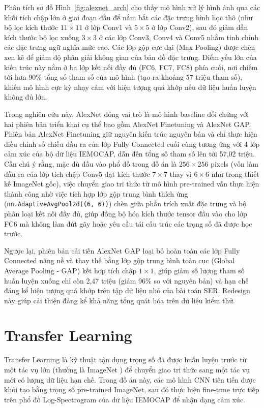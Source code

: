 Phân tích sơ đồ Hình~\ref{fig:alexnet_arch} cho thấy mô hình xử lý hình ảnh qua các khối tích chập lớn ở giai đoạn đầu để nắm bắt các đặc trưng hình học thô (như bộ lọc kích thước $11\times11$ ở lớp Conv1 và $5\times5$ ở lớp Conv2), sau đó giảm dần kích thước bộ lọc xuống $3\times3$ ở các lớp Conv3, Conv4 và Conv5 nhằm tinh chỉnh các đặc trưng ngữ nghĩa mức cao. Các lớp gộp cực đại (Max Pooling) được chèn xen kẽ để giảm độ phân giải không gian của bản đồ đặc trưng. Điểm yếu lớn của kiến trúc này nằm ở ba lớp kết nối đầy đủ (FC6, FC7, FC8) phía cuối, nơi chiếm tới hơn 90\% tổng số tham số của mô hình (tạo ra khoảng 57 triệu tham số), khiến mô hình cực kỳ nhạy cảm với hiện tượng quá khớp nếu dữ liệu huấn luyện không đủ lớn.

Trong nghiên cứu này, AlexNet đóng vai trò là mô hình baseline đối chứng với hai phiên bản triển khai cụ thể bao gồm AlexNet Finetuning và AlexNet GAP. Phiên bản AlexNet Finetuning giữ nguyên kiến trúc nguyên bản và chỉ thực hiện điều chỉnh số chiều đầu ra của lớp Fully Connected cuối cùng tương ứng với 4 lớp cảm xúc của bộ dữ liệu IEMOCAP, dẫn đến tổng số tham số lên tới 57,02 triệu. Cần chú ý rằng, mặc dù đầu vào phổ đồ trong đồ án là $256 \times 256$ pixels (vốn làm đầu ra của lớp tích chập Conv5 đạt kích thước $7 \times 7$ thay vì $6 \times 6$ như trong thiết kế ImageNet gốc), việc chuyển giao tri thức từ mô hình pre-trained vẫn thực hiện thành công nhờ việc tích hợp lớp gộp trung bình thích ứng (\texttt{nn.AdaptiveAvgPool2d((6, 6))}) chèn giữa phần trích xuất đặc trưng và bộ phân loại kết nối đầy đủ, giúp đồng bộ hóa kích thước tensor đầu vào cho lớp FC6 mà không làm đứt gãy hoặc yêu cầu tái cấu trúc các trọng số đã được học trước. 

Ngược lại, phiên bản cải tiến AlexNet GAP loại bỏ hoàn toàn các lớp Fully Connected nặng nề và thay thế bằng lớp gộp trung bình toàn cục (Global Average Pooling - GAP) kết hợp tích chập $1\times1$, giúp giảm số lượng tham số huấn luyện xuống chỉ còn 2,47 triệu (giảm 96\% so với nguyên bản) và hạn chế đáng kể hiện tượng quá khớp trên tập dữ liệu nhỏ của bài toán SER. Redesign này giúp cải thiện đáng kể khả năng tổng quát hóa trên dữ liệu kiểm thử.


\section{Transfer Learning}
\label{sec:transfer_learning}

Transfer Learning là kỹ thuật tận dụng trọng số đã được huấn luyện trước từ một tác vụ lớn (thường là ImageNet \cite{deng2009}) để chuyển giao tri thức sang một tác vụ mới có lượng dữ liệu hạn chế. Trong đồ án này, các mô hình CNN tiên tiến được khởi tạo bằng trọng số pre-trained ImageNet, sau đó thực hiện fine-tune trực tiếp trên phổ đồ Log-Spectrogram của dữ liệu IEMOCAP để nhận dạng cảm xúc.

